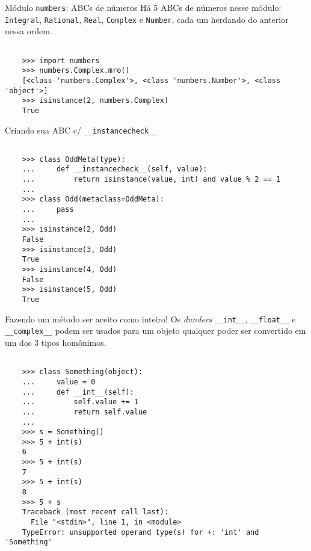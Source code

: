 \documentclass[utf8]{beamer}
\begin{document}
\begin{frame}[fragile]{Módulo \texttt{numbers}: ABCs de números}
  Há 5 ABCs de números nesse módulo:
  \texttt{Integral},
  \texttt{Rational},
  \texttt{Real},
  \texttt{Complex} e
  \texttt{Number},
  cada um herdando do anterior nessa ordem.

  \begin{verbatim}

    >>> import numbers
    >>> numbers.Complex.mro()
    [<class 'numbers.Complex'>, <class 'numbers.Number'>, <class 'object'>]
    >>> isinstance(2, numbers.Complex)
    True

  \end{verbatim}

\end{frame}


\begin{frame}[fragile]{Criando sua ABC c/
                       \texttt{\_\_instancecheck\_\_}}
  \begin{verbatim}

    >>> class OddMeta(type):
    ...     def __instancecheck__(self, value):
    ...         return isinstance(value, int) and value % 2 == 1
    ...
    >>> class Odd(metaclass=OddMeta):
    ...     pass
    ...
    >>> isinstance(2, Odd)
    False
    >>> isinstance(3, Odd)
    True
    >>> isinstance(4, Odd)
    False
    >>> isinstance(5, Odd)
    True

  \end{verbatim}
\end{frame}


\begin{frame}[fragile]{Fazendo um método ser aceito como inteiro!}
  Os \emph{dunders}
  \texttt{__int__},
  \texttt{__float__} e
  \texttt{__complex__}
  podem ser usados para um objeto qualquer
  poder ser convertido em um dos $3$ tipos homônimos.

  \begin{verbatim}

    >>> class Something(object):
    ...     value = 0
    ...     def __int__(self):
    ...         self.value += 1
    ...         return self.value
    ...
    >>> s = Something()
    >>> 5 + int(s)
    6
    >>> 5 + int(s)
    7
    >>> 5 + int(s)
    8
    >>> 5 + s
    Traceback (most recent call last):
      File "<stdin>", line 1, in <module>
    TypeError: unsupported operand type(s) for +: 'int' and 'Something'

  \end{verbatim}
\end{frame}
\end{document}
